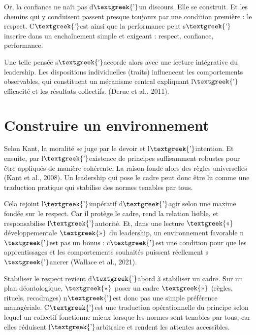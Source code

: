 \documentclass{article}
\begin{document}
Or, la confiance ne naît pas d$\text{\textgreek{’}}$un discours. Elle se construit. Et les chemins qui y conduisent
passent presque toujours par une condition première : le respect. C$\text{\textgreek{’}}$est ainsi que la performance
peut s$\text{\textgreek{’}}$inscrire dans un enchaînement simple et exigeant : respect, confiance, performance. 

Une telle pensée s$\text{\textgreek{’}}$accorde alors avec une lecture intégrative du leadership. Les dispositions
individuelles (traits) influencent les comportements observables, qui constituent un mécanisme central expliquant
l$\text{\textgreek{’}}$efficacité et les résultats collectifs. \label{ref:RNDs9ofFbAlk6}(Derue et al., 2011). 

\section{Construire un environnement}
Selon Kant, la moralité se juge par le devoir et l$\text{\textgreek{’}}$intention. Et ensuite, par
l$\text{\textgreek{’}}$existence de principes suffisamment robustes pour être appliqués de manière cohérente. La raison
fonde alors des règles universelles \label{ref:RNDkGpEPQ9nT6}(Kant et al., 2008). Un leadership qui pose le cadre peut
donc être lu comme une traduction pratique qui stabilise des normes tenables par tous. 

Cela rejoint l$\text{\textgreek{’}}$impératif d$\text{\textgreek{’}}$agir selon une maxime fondée sur le respect. Car il
protège le cadre, rend la relation lisible, et responsabilise l$\text{\textgreek{’}}$autorité. Et, dans une lecture
$\text{\textgreek{«}}$ développementale $\text{\textgreek{»}}$ du leadership, un environnement favorable
n$\text{\textgreek{’}}$est pas un bonus : c$\text{\textgreek{’}}$est une condition pour que les apprentissages et les
comportements souhaités puissent réellement s$\text{\textgreek{’}}$ancrer \label{ref:RNDdzDKSYVG9u}(Wallace et al.,
2021). 

Stabiliser le respect revient d$\text{\textgreek{’}}$abord à stabiliser un cadre. Sur un plan déontologique,
$\text{\textgreek{«}}$ poser un cadre $\text{\textgreek{»}}$ (règles, rituels, recadrages) n$\text{\textgreek{’}}$est
donc pas une simple préférence managériale. C$\text{\textgreek{’}}$est une traduction opérationnelle du principe selon
lequel un collectif fonctionne mieux lorsque les normes sont tenables par tous, car elles réduisent
l$\text{\textgreek{’}}$arbitraire et rendent les attentes accessibles.
\end{document}
